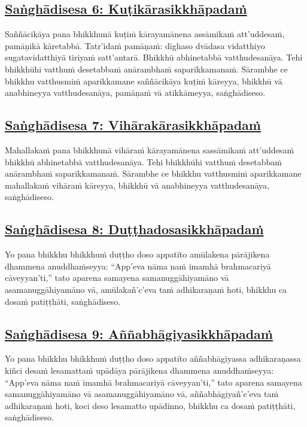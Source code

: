 \subsection*{\hyperref[comm6]{Saṅghādisesa 6: Kuṭikārasikkhāpadaṁ}}
\label{sd6}
Saññācikāya pana bhikkhunā kuṭiṁ kārayamānena assāmikaṁ att'uddesaṁ, pamāṇikā kāretabbā. Tatr'idaṁ pamāṇaṁ: dīghaso dvādasa vidatthiyo sugatavidatthiyā tiriyaṁ satt'antarā. Bhikkhū abhinetabbā vatthudesanāya. Tehi bhikkhūhi vatthuṁ desetabbaṁ anārambhaṁ saparikkamanaṁ. Sārambhe ce bhikkhu vatthusmiṁ aparikkamane saññācikāya kuṭiṁ kāreyya, bhikkhū vā anabhineyya vatthudesanāya, pamāṇaṁ vā atikkāmeyya, saṅghādiseso.

\subsection*{\hyperref[comm7]{Saṅghādisesa 7: Vihārakārasikkhāpadaṁ}}
\label{sd7}
Mahallakaṁ pana bhikkhunā vihāraṁ kārayamānena sassāmikaṁ att'uddesaṁ bhikkhū abhinetabbā vatthudesanāya. Tehi bhikkhūhi vatthuṁ desetabbaṁ anārambhaṁ saparikkamanaṁ. Sārambhe ce bhikkhu vatthusmiṁ aparikkamane mahallakaṁ vihāraṁ kāreyya, bhikkhū vā anabhineyya vatthudesanāya, saṅghādiseso.

\subsection*{\hyperref[comm8]{Saṅghādisesa 8: Duṭṭhadosasikkhāpadaṁ}}
\label{sd8}
Yo pana bhikkhu bhikkhuṁ duṭṭho doso appatīto amūlakena pārājikena dhammena anuddhaṁseyya: ``App'eva nāma naṁ imamhā brahmacariyā cāveyyan'ti,'' tato aparena samayena samanuggāhiyamāno vā asamanuggāhiyamāno vā, amūlakañ'c'eva taṁ adhikaraṇaṁ hoti, bhikkhu ca dosaṁ patiṭṭhāti, saṅghādiseso.

\subsection*{\hyperref[comm9]{Saṅghādisesa 9: Aññabhāgiyasikkhāpadaṁ}}
\label{sd9}
Yo pana bhikkhu bhikkhuṁ duṭṭho doso appatīto aññabhāgiyassa adhikaraṇassa kiñci desaṁ lesamattaṁ upādāya pārājikena dhammena anuddhaṁseyya: ``App'eva nāma naṁ imamhā brahmacariyā cāveyyan'ti,'' tato aparena samayena samanuggāhiyamāno vā asamanuggāhiyamāno vā, aññabhāgiyañ'c'eva taṁ adhikaraṇaṁ hoti, koci deso lesamatto upādinno, bhikkhu ca dosaṁ patiṭṭhāti, saṅghādiseso.

